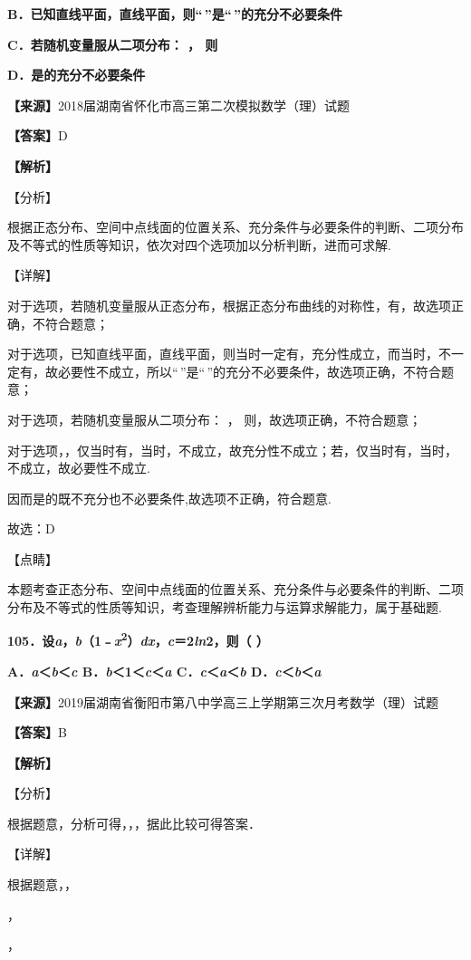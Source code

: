\documentclass[
]{article}
\begin{document}
\textbf{B．已知直线平面，直线平面，则``\,''是``\,''的充分不必要条件}

\textbf{C．若随机变量服从二项分布： ， 则}

\textbf{D．是的充分不必要条件}

\textbf{【来源】}2018届湖南省怀化市高三第二次模拟数学（理）试题

\textbf{【答案】}D

\textbf{【解析】}

【分析】

根据正态分布、空间中点线面的位置关系、充分条件与必要条件的判断、二项分布及不等式的性质等知识，依次对四个选项加以分析判断，进而可求解.

【详解】

对于选项，若随机变量服从正态分布，根据正态分布曲线的对称性，有，故选项正确，不符合题意；

对于选项，已知直线平面，直线平面，则当时一定有，充分性成立，而当时，不一定有，故必要性不成立，所以``\,''是``\,''的充分不必要条件，故选项正确，不符合题意；

对于选项，若随机变量服从二项分布： ， 则，故选项正确，不符合题意；

对于选项，，仅当时有，当时，不成立，故充分性不成立；若，仅当时有，当时，不成立，故必要性不成立.

因而是的既不充分也不必要条件,故选项不正确，符合题意.

故选：D

【点睛】

本题考查正态分布、空间中点线面的位置关系、充分条件与必要条件的判断、二项分布及不等式的性质等知识，考查理解辨析能力与运算求解能力，属于基础题.

\textbf{105．设\emph{a}，\emph{b}（1﹣\emph{x}\textsuperscript{2}）\emph{dx}，\emph{c}＝2\emph{ln}2，则（
）}

\textbf{A．\emph{a}＜\emph{b}＜\emph{c}
B．\emph{b}＜1＜\emph{c}＜\emph{a} C．\emph{c}＜\emph{a}＜\emph{b}
D．\emph{c}＜\emph{b}＜\emph{a}}

\textbf{【来源】}2019届湖南省衡阳市第八中学高三上学期第三次月考数学（理）试题

\textbf{【答案】}B

\textbf{【解析】}

【分析】

根据题意，分析可得，，，据此比较可得答案．

【详解】

根据题意，，

，

，
\end{document}
